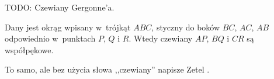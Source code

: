 TODO: Czewiany Gergonne'a.

\begin{definition} %
%
\label{punkt_gergonne}
	Dany jest okrąg wpisany w~trójkąt $ABC$, styczny do boków $BC$, $AC$, $AB$ odpowiednio w~punktach $P$, $Q$ i $R$.
	Wtedy czewiany $AP$, $BQ$ i $CR$ są współpękowe.
\end{definition}

To samo, ale bez użycia słowa ,,czewiany'' napisze Zetel \cite[s. 15, 25]{zetel_2020}.


%
